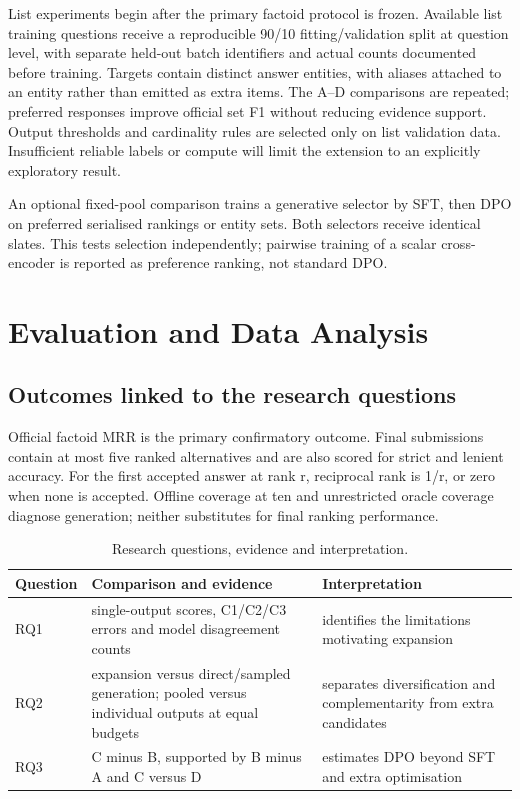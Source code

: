\documentclass[12pt,a4paper]{article}
\begin{document}
List experiments begin after the primary factoid protocol is frozen. Available list training questions receive a reproducible 90/10 fitting/validation split at question level, with separate held-out batch identifiers and actual counts documented before training. Targets contain distinct answer entities, with aliases attached to an entity rather than emitted as extra items. The A--D comparisons are repeated; preferred responses improve official set F1 without reducing evidence support. Output thresholds and cardinality rules are selected only on list validation data. Insufficient reliable labels or compute will limit the extension to an explicitly exploratory result.

An optional fixed-pool comparison trains a generative selector by SFT, then DPO on preferred serialised rankings or entity sets. Both selectors receive identical slates. This tests selection independently; pairwise training of a scalar cross-encoder is reported as preference ranking, not standard DPO.

\section{Evaluation and Data Analysis}

\subsection{Outcomes linked to the research questions}

Official factoid MRR is the primary confirmatory outcome. Final submissions contain at most five ranked alternatives and are also scored for strict and lenient accuracy. For the first accepted answer at rank r, reciprocal rank is 1/r, or zero when none is accepted. Offline coverage at ten and unrestricted oracle coverage diagnose generation; neither substitutes for final ranking performance.

\begin{table}[htbp]
\centering
\caption{Research questions, evidence and interpretation.}
\label{tab:evaluation}
\small
{}
\begin{tabularx}{\textwidth}{>{\raggedright\arraybackslash}p{}>{\raggedright\arraybackslash}X>{\raggedright\arraybackslash}X}
\toprule
\textbf{Question} & \textbf{Comparison and evidence} & \textbf{Interpretation} \\
\midrule
RQ1 & single-output scores, C1/C2/C3 errors and model disagreement counts & identifies the limitations motivating expansion \\
RQ2 & expansion versus direct/sampled generation; pooled versus individual outputs at equal budgets & separates diversification and complementarity from extra candidates \\
RQ3 & C minus B, supported by B minus A and C versus D & estimates DPO beyond SFT and extra optimisation \\
\bottomrule
\end{tabularx}
\end{table}
\end{document}
